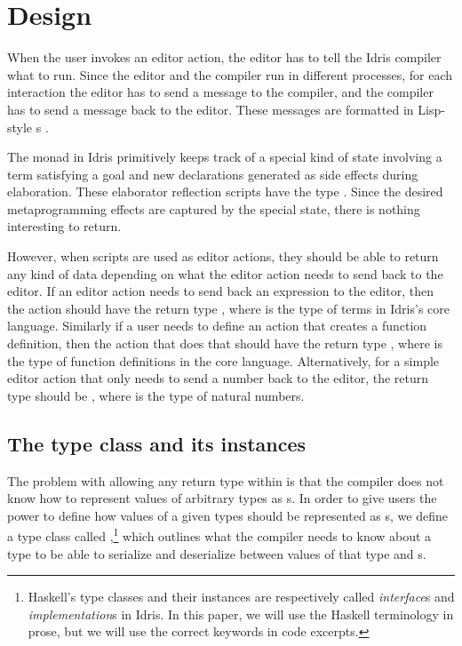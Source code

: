 \section{Design}\label{sec:design}

When the user invokes an editor action, the editor has to tell the Idris
compiler what to run. Since the editor and the compiler run in different processes,
for each interaction the editor has to send a message to the compiler,
and the compiler has to send a message back to the editor.
These messages are formatted in Lisp-style \sexp{}s \cite{mccarthy}.

The \Elab{} monad in Idris primitively keeps track of a special kind of state
involving a term satisfying a goal and new declarations generated as
side effects during elaboration.
These elaborator reflection scripts have the type \mbox{}. Since the
desired metaprogramming effects are captured by the special state, there is
nothing interesting to return.

However, when \Elab{} scripts are used as editor actions, they should be able
to return any kind of data depending on what the editor action needs to send
back to the editor.
If an editor action needs to send back an expression to the editor, then the
action should have the return type \mbox{}, where  is the type of
terms in Idris's core language.
Similarly if a user needs to define an action that creates a function definition,
then the action that does that should have the return type \mbox{},
where  is the type of function definitions in the core language.
Alternatively, for a simple editor action that only needs to send a number back
to the editor, the return type should be \mbox{}, where  is the
type of natural numbers.

\subsection{The \Editorable{} type class and its instances}
\label{ssec:editorable}

The problem with allowing any return type within \Elab{} is that the compiler
does not know how to represent values of arbitrary types as \sexp{}s.
In order to give users the power to define how values of a given types should
be represented as \sexp{}s, we define a type class called
\Editorable{},\footnote{Haskell's type classes and their instances are
respectively called \mbox{\emph{interface}s} and \mbox{\emph{implementation}s}
in Idris. In this paper, we will use the Haskell terminology in prose, but we
will use the correct keywords in code excerpts.}
which outlines what the compiler needs to know about a type to be able to serialize and deserialize between values of that type and \sexp{}s.

